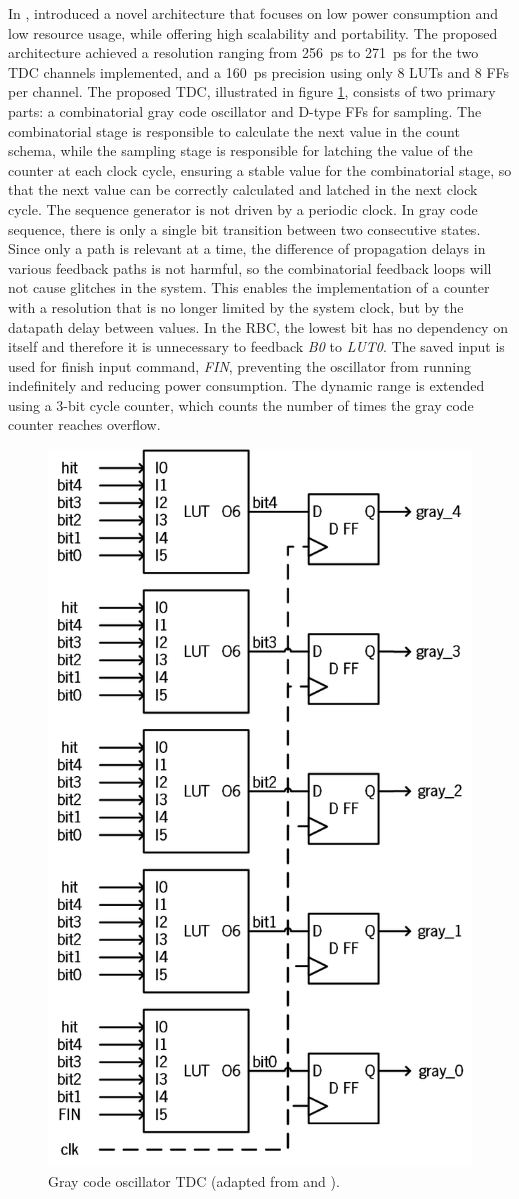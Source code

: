 In \citeyear{gray_code_first}, \citet{gray_code_first} introduced a novel architecture that focuses on low power consumption and low resource usage, while offering high scalability and portability. The proposed architecture achieved a resolution ranging from 256~ps to 271~ps for the two \gls{TDC} channels implemented, and a 160~ps precision using only 8 \glspl{LUT} and 8 \glspl{FF} per channel. The proposed \gls{TDC}, illustrated in figure \ref{fig:gray_code_fisrt}, consists of two primary parts: a combinatorial gray code oscillator and D-type \glspl{FF} for sampling. The combinatorial stage is responsible to calculate the next value in the count schema, while the sampling stage is responsible for latching the value of the counter at each clock cycle, ensuring a stable value for the combinatorial stage, so that the next value can be correctly calculated and latched in the next clock cycle. The sequence generator is not driven by a periodic clock. In gray code sequence, there is only a single bit transition between two consecutive states. Since only a path is relevant at a time, the difference of propagation delays in various feedback paths is not harmful, so the combinatorial feedback loops will not cause glitches in the system. This enables the implementation of a counter with a resolution that is no longer limited by the system clock, but by the datapath delay between values. In the \gls{RBC}, the lowest bit has no dependency on itself and therefore it is unnecessary to feedback \textit{B0} to \textit{LUT0}. The saved input is used for finish input command, \textit{FIN}, preventing the oscillator from running indefinitely and reducing power consumption. The dynamic range is extended using a 3-bit cycle counter, which counts the number of times the gray code counter reaches overflow.

\begin{figure}[ht!]
	\centering
	\includegraphics[width=.35\textwidth]{img/02_StateofArt/gray_code_first.png}
	\caption{Gray code oscillator TDC (adapted from \citep{gray_code_first} and \citep{gray_code_machado}).}
	\label{fig:gray_code_fisrt}
\end{figure}

